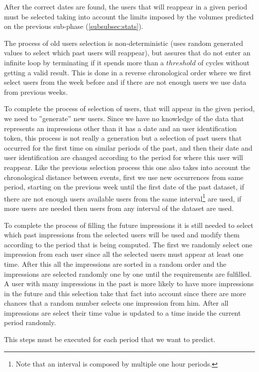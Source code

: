 After the correct dates are found, the users that will reappear in a given
period must be selected taking into account the limits imposed by the volumes
predicted on the previous sub-phase (\ref{subsubsec:stats}).

The process of old users selection is non-deterministic (uses random generated
values to select which past users will reappear), but assures that do not enter
an infinite loop by terminating if it spends more than a $threshold$ of cycles
without getting a valid result. This is done in a reverse chronological order
where we first select users from the week before and if there are not enough
users we use data from previous weeks.

To complete the process of selection of users, that will appear in the given
period, we need to ''generate'' new users. Since we have no knowledge of the
data that represents an impressions other than it has a date and an user
identification token, this process is not really a generation but a selection of
past users that occurred for the first time on similar periods of the past, and
then their date and user identification are changed according to the period for
where this user will reappear. Like the previous selection process this one also
takes into account the chronological distance between events, first we use new
occurrences from same period, starting on the previous week until the first date
of the past dataset, if there are not enough users available users from the
same interval\footnote{Note that an interval is composed by multiple one hour
periods.} are used, if more users are needed then users from any interval of the
dataset are used.

To complete the process of filling the future impressions it is still needed to
select which past impressions from the selected users will be used and modify
them according to the period that is being computed. The first we randomly
select one impression from each user since all the selected users must appear at
least one time. After this all the impressions are sorted in a random order and
the impressions are selected randomly one by one until the requirements are
fulfilled. A user with many impressions in the past is more likely to have more
impressions in the future and this selection take that fact into account since
there are more chances that a random number selects one impression from him.
After all impressions are select their time value is updated to a time inside
the current period randomly.

This steps must be executed for each period that we want to predict.


